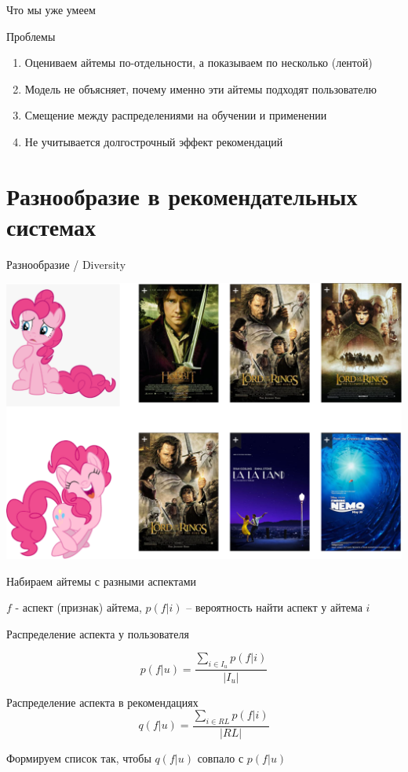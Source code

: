 \documentclass[11pt,aspectratio=169,handout]{beamer}
\begin{document}
\begin{frame}{Что мы уже умеем}
\vfill

Проблемы
\begin{enumerate}[<+->]
\item Оцениваем айтемы по-отдельности, а показываем по несколько (лентой)
\item Модель не объясняет, почему именно эти айтемы подходят пользователю
\item Смещение между распределениями на обучении и применении
\item {\color{blue} Не учитывается долгострочный эффект рекомендаций}
\end{enumerate}

\end{frame}

\section{Разнообразие в рекомендательных системах}

\begin{frame}{Разнообразие / Diversity}

\begin{center}
\includegraphics[scale=0.22]{images/diversity.png}
\end{center}

\end{frame}

\begin{frame}{Набираем айтемы с разными аспектами}

$f$ - аспект (признак) айтема, $p(f | i)$ -- вероятность найти аспект у айтема $i$

\vfill

Распределение аспекта у пользователя

\[
p(f | u) = \frac{\sum_{i \in I_u} p(f | i)}{|I_u|}  
\]

Распределение аспекта в рекомендациях
\[
q(f | u) = \frac{\sum_{i \in RL} p(f | i)}{|RL|}
\]

\begin{tcolorbox}[colback=info!5,colframe=info!80,title=]
Формируем список так, чтобы $q(f | u)$ совпало с $p(f | u)$
\end{tcolorbox}

\end{frame}
\end{document}

